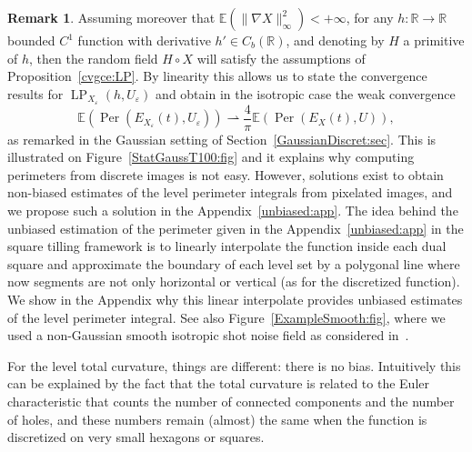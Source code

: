 \documentclass[10pt]{amsart}
\theoremstyle{definition}\newtheorem{defi}[theo]{Definition}\newtheorem{rema}[theo]{Remark}\newtheorem{exam}[theo]{Example}\newtheorem{exem}[theo]{Example}\newtheorem{nota}[theo]{Notation}
\newcommand{\R}{\mathbb{R}}
\newcommand{\E}{\mathbb{E}}
\newcommand{\eps}{\varepsilon}
\DeclareMathOperator{\LP}{LP}
\DeclareMathOperator{\Per}{Per}
\begin{document}
\pagebreak
\begin{rema}
Assuming moreover that $\E(\|\nabla X\|_\infty^2)<+\infty$, for any $h:\R\rightarrow
\R$ bounded $C^1$ function with derivative $h'\in C_b(\R)$, and denoting by $H$ a primitive of $h$, then the random field $H\circ X$ will satisfy the assumptions of Proposition~\ref{cvgce:LP}. By linearity this allows us to state the convergence results for $\LP_{X_\eps}(h,U_\eps)$ and obtain in the isotropic case the weak convergence
\[
\E\left(\Per(E_{X_\eps}(t),U_\eps)\right)\rightharpoonup \frac{4}{\pi} \E\left(\Per(E_{X}(t),U)\right),
\]
as remarked in the Gaussian setting of Section~\ref{GaussianDiscret:sec}. This is illustrated on Figure~\ref{StatGaussT100:fig} and it explains why computing perimeters from discrete images is not easy. However, solutions exist to obtain non-biased estimates of the level perimeter integrals from pixelated images, and we propose such a solution in the Appendix~\ref{unbiased:app}. The idea behind the unbiased estimation of the perimeter given in the Appendix~\ref{unbiased:app} in the square tilling framework is to linearly interpolate the function inside each dual square and approximate the boundary of each level set by a polygonal line where now segments are not only horizontal or vertical (as for the discretized function). We show in the Appendix why this linear interpolate provides unbiased estimates of the level perimeter integral. See also Figure~\ref{ExampleSmooth:fig}, where we used a non-Gaussian smooth isotropic shot noise field as considered in~\cite{BD-Geometry-published}.
\end{rema}



For the level total curvature, things are different: there is no bias. Intuitively this can be explained by the fact that the total curvature is related to the Euler characteristic that counts the number of connected components and the number of holes, and these numbers remain (almost) the same when the function is discretized on very small hexagons or squares.
\end{document}
